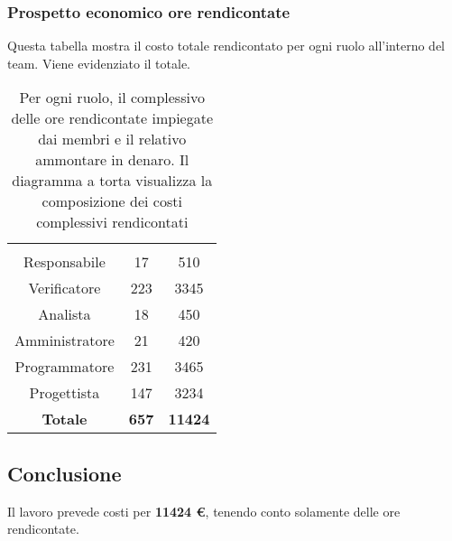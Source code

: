 \subsubsection{Prospetto economico ore rendicontate}
Questa tabella mostra il costo totale rendicontato per ogni ruolo all'interno del team. Viene evidenziato il totale.

\begin{table}[H]
	{\setlength{\parindent}{0cm}
		\begin{minipage}{.43\textwidth}
			\begin{tabular}{ccc}
				\rowcolorhead
				\headertitle{Ruolo} & \headertitle{Ore} & \headertitle{Costo(\euro{})}\\
				Responsabile & 17 & 510\\
				Verificatore & 223 & 3345\\
				Analista & 18 & 450\\
				Amministratore & 21 & 420\\
				Programmatore & 231 & 3465\\
				Progettista & 147 & 3234\\
				\hline
				\textbf{Totale} & \textbf{657} & \textbf{11424}\\
			\end{tabular}
		\end{minipage}%
		\begin{minipage}{.57\textwidth}
	\end{minipage} }
	\caption[Prospetto economico complessivo delle ore rendicontate]{Per ogni ruolo, il complessivo delle ore rendicontate impiegate dai membri e il relativo ammontare in denaro. Il diagramma a torta visualizza la composizione dei costi complessivi rendicontati}
\end{table}


\subsection{Conclusione}
Il lavoro prevede costi per \textbf{11424 \euro{}}, tenendo conto solamente delle ore rendicontate.
